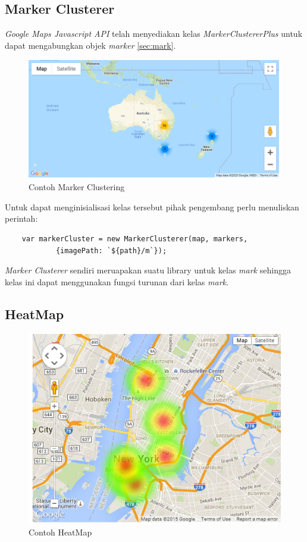 \subsection{Marker Clusterer}
\textit{Google Maps Javascript API} telah menyediakan kelas \textit{MarkerClustererPlus} untuk dapat mengabungkan objek \textit{marker} \ref{sec:mark}.
\begin{figure}[H]
	\centering
	\includegraphics[scale=0.5]{Gambar/marker_clustering.PNG}
	\caption{Contoh Marker Clustering}
	\label{fig:my_label}
\end{figure}
Untuk dapat  menginisialisasi kelas tersebut pihak pengembang perlu menuliskan perintah:
\begin{lstlisting}
    var markerCluster = new MarkerClusterer(map, markers,
            {imagePath: `${path}/m`});
\end{lstlisting}
\textit{Marker Clusterer} sendiri meruapakan suatu library untuk kelas \textit{mark} sehingga kelas ini dapat menggunakan fungsi turunan dari kelas \textit{mark}.

\subsection{HeatMap}
\begin{figure}[H]
	\centering
	\includegraphics[scale=0.8]{Gambar/heat-map-example.png}
	\caption{Contoh HeatMap}
	\label{fig:my_label}
\end{figure}


